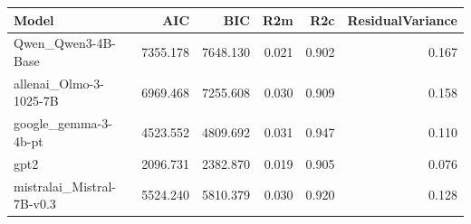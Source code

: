 \begin{tabular}{lrrrrr}
\toprule
Model & AIC & BIC & R2m & R2c & ResidualVariance \\
\midrule
Qwen_Qwen3-4B-Base & 7355.178 & 7648.130 & 0.021 & 0.902 & 0.167 \\
allenai_Olmo-3-1025-7B & 6969.468 & 7255.608 & 0.030 & 0.909 & 0.158 \\
google_gemma-3-4b-pt & 4523.552 & 4809.692 & 0.031 & 0.947 & 0.110 \\
gpt2 & 2096.731 & 2382.870 & 0.019 & 0.905 & 0.076 \\
mistralai_Mistral-7B-v0.3 & 5524.240 & 5810.379 & 0.030 & 0.920 & 0.128 \\
\bottomrule
\end{tabular}
